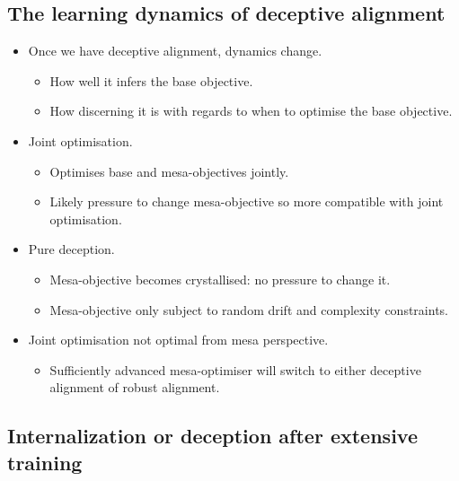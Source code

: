 \subsection{The learning dynamics of deceptive alignment}

\begin{itemize}
    \item Once we have deceptive alignment, dynamics change.
    \begin{itemize}
        \item How well it infers the base objective.
        \item How discerning it is with regards to when to optimise the base objective.
    \end{itemize}
    \item Joint optimisation.
    \begin{itemize}
        \item Optimises base and mesa-objectives jointly.
        \item Likely pressure to change mesa-objective so more compatible with joint optimisation.
    \end{itemize}
    \item Pure deception.
    \begin{itemize}
        \item Mesa-objective becomes crystallised: no pressure to change it.
        \item Mesa-objective only subject to random drift and complexity constraints.
    \end{itemize}
    \item Joint optimisation not optimal from mesa perspective.
    \begin{itemize}
        \item Sufficiently advanced mesa-optimiser will switch to either deceptive alignment of robust alignment.
    \end{itemize}
\end{itemize}


\subsection{Internalization or deception after extensive training}

